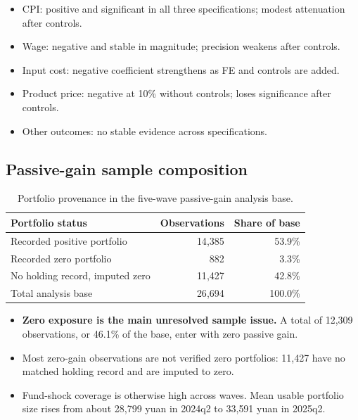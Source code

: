 \documentclass[11pt,letterpaper,english,final]{article}
\begin{document}
\begin{itemize}
\item CPI: positive and significant in all three specifications; modest attenuation after controls.
\item Wage: negative and stable in magnitude; precision weakens after controls.
\item Input cost: negative coefficient strengthens as FE and controls are added.
\item Product price: negative at 10\% without controls; loses significance after controls.
\item Other outcomes: no stable evidence across specifications.
\end{itemize}

\subsection{Passive-gain sample composition}

\begin{table}[H]
\centering
\small
\setlength{\tabcolsep}{7pt}
\caption{Portfolio provenance in the five-wave passive-gain analysis base.}
\label{tab:passive_gain_portfolio_provenance_20260920}
\begin{tabular}{lrr}
\toprule
Portfolio status & Observations & Share of base \\
\midrule
Recorded positive portfolio & 14{,}385 & 53.9\% \\
Recorded zero portfolio & 882 & 3.3\% \\
No holding record, imputed zero & 11{,}427 & 42.8\% \\
\midrule
Total analysis base & 26{,}694 & 100.0\% \\
\bottomrule
\end{tabular}
\end{table}

\begin{itemize}
\item \textbf{Zero exposure is the main unresolved sample issue.} A total of 12{,}309 observations, or 46.1\% of the base, enter with zero passive gain.
\item Most zero-gain observations are not verified zero portfolios: 11{,}427 have no matched holding record and are imputed to zero.
\item Fund-shock coverage is otherwise high across waves. Mean usable portfolio size rises from about 28{,}799 yuan in 2024q2 to 33{,}591 yuan in 2025q2.
\end{itemize}
\end{document}
